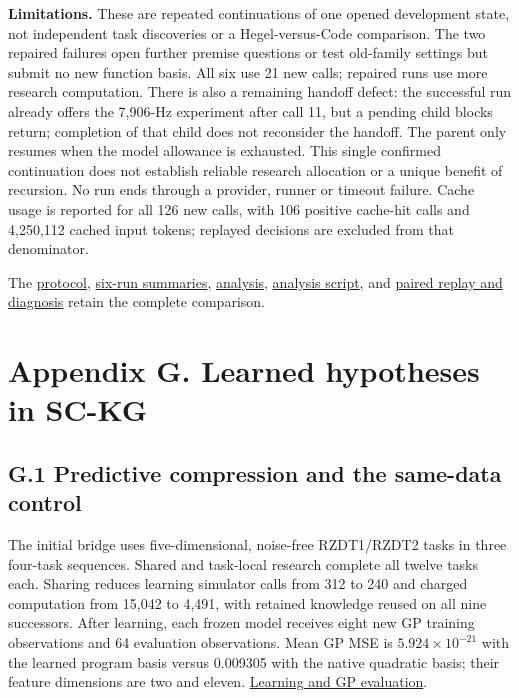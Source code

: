 \documentclass[11pt,a4paper]{article}
\begin{document}
\textbf{Limitations.} These are repeated continuations of one opened development state, not independent task discoveries or a Hegel-versus-Code comparison. The two repaired failures open further premise questions or test old-family settings but submit no new function basis. All six use 21 new calls; repaired runs use more research computation. There is also a remaining handoff defect: the successful run already offers the 7,906-Hz experiment after call 11, but a pending child blocks return; completion of that child does not reconsider the handoff. The parent only resumes when the model allowance is exhausted. This single confirmed continuation does not establish reliable research allocation or a unique benefit of recursion. No run ends through a provider, runner or timeout failure. Cache usage is reported for all 126 new calls, with 106 positive cache-hit calls and 4,250,112 cached input tokens; replayed decisions are excluded from that denominator.


The \hyperlink{artifact-119}{protocol}, \hyperlink{artifact-120}{six-run summaries}, \hyperlink{artifact-121}{analysis}, \hyperlink{artifact-122}{analysis script}, and \hyperlink{artifact-123}{paired replay and diagnosis} retain the complete comparison.


\section*{Appendix G. Learned hypotheses in SC-KG}

\subsection*{G.1 Predictive compression and the same-data control}

The initial bridge uses five-dimensional, noise-free RZDT1/RZDT2 tasks in three
four-task sequences. Shared and task-local research complete all twelve tasks
each. Sharing reduces learning simulator calls from 312 to 240 and charged
computation from 15,042 to 4,491, with retained knowledge reused on all nine
successors. After learning, each frozen model receives eight new GP training
observations and 64 evaluation observations. Mean GP MSE is
\(5.924\times10^{-21}\) with the learned program basis versus 0.009305 with the
native quadratic basis; their feature dimensions are two and eleven.
\hyperlink{artifact-124}{Learning and GP evaluation}.
\end{document}
